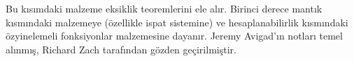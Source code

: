 \documentclass[../../include/open-logic-part]{subfiles}
\begin{document}

\begin{editorial}
 Bu kısımdaki malzeme eksiklik teoremlerini ele alır. Birinci derece
 mantık kısmındaki malzemeye (özellikle ispat sistemine) ve hesaplanabilirlik
 kısmındaki özyinelemeli fonksiyonlar malzemesine dayanır. Jeremy Avigad'ın
 notları temel alınmış, Richard Zach tarafından gözden geçirilmiştir.
\end{editorial}






\OLEndPartHook
\end{document}

